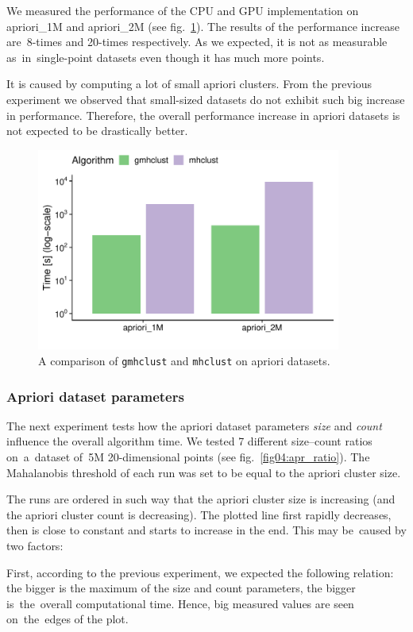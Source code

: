 We measured the performance of the CPU and GPU implementation on apriori\_1M and apriori\_2M (see fig.~\ref{fig04:apr_perf_comp}). The results of the performance increase are~8-times and 20-times respectively. As we expected, it is not as measurable as~in~single-point datasets even though it has much more points. 

It is caused by computing a lot of small apriori clusters. From the previous experiment we observed that small-sized datasets do not exhibit such big increase in performance. Therefore, the overall performance increase in apriori datasets is not expected to be drastically better.

\begin{figure}\centering
	\includegraphics[width=10cm]{img/apriori_perf_comp}
	\caption{A comparison of \texttt{gmhclust} and \texttt{mhclust} on apriori datasets.}
	\label{fig04:apr_perf_comp}
\end{figure}

\subsubsection{Apriori dataset parameters}

The next experiment tests how the apriori dataset parameters \emph{size} and \emph{count} influence the overall algorithm time. We tested 7 different size--count ratios on~a~dataset of~5M 20-dimensional points (see fig.~\ref{fig04:apr_ratio}). The Mahalanobis threshold of each run was set to be equal to the apriori cluster size.

The runs are ordered in such way that the apriori cluster size is increasing (and the apriori cluster count is decreasing). The plotted line first rapidly decreases, then is close to constant and starts to increase in the end. This may be~caused by two factors:

First, according to the previous experiment, we expected the following relation: the bigger is the maximum of the size and count parameters, the bigger is~the~overall computational time. Hence, big measured values are seen on~the~edges of the plot. 

